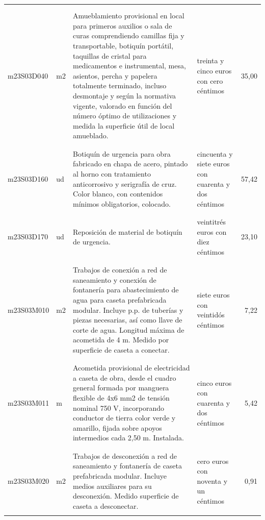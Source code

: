 \documentclass{book}%
\begin{document}
\begin{supertabular}{|l|l|p{5cm}|p{3cm}|r|}
&&&&\\%
&&&&\\%
m23S03D040&m2&Amueblamiento provisional en local para primeros auxilios o sala de curas comprendiendo camillas fija y transportable, botiquín portátil, taquillas de cristal para medicamentos e instrumental, mesa, asientos, percha y papelera totalmente terminado, incluso desmontaje y según la normativa vigente, valorado en función del número óptimo de utilizaciones y medida la superficie útil de local amueblado.&treinta y cinco euros con cero céntimos&35,00\\%
&&&&\\%
&&&&\\%
m23S03D160&ud&Botiquín de urgencia para obra fabricado en chapa de acero, pintado al horno con tratamiento anticorrosivo y serigrafía de cruz. Color blanco, con contenidos mínimos obligatorios, colocado.&cincuenta y siete euros con cuarenta y dos céntimos&57,42\\%
&&&&\\%
&&&&\\%
m23S03D170&ud&Reposición de material de botiquín de urgencia.&veintitrés euros con diez céntimos&23,10\\%
&&&&\\%
&&&&\\%
m23S03M010&m2&Trabajos de conexión a red de saneamiento y conexión de fontanería para abastecimiento de agua para caseta prefabricada modular. Incluye p.p. de tuberías y piezas necesarias, así como llave de corte de agua. Longitud máxima de acometida de 4 m. Medido por superficie de caseta a conectar.&siete euros con veintidós céntimos&7,22\\%
&&&&\\%
&&&&\\%
m23S03M011&m&Acometida provisional de electricidad a caseta de obra, desde el cuadro general formada por manguera flexible de 4x6 mm2 de tensión nominal 750 V, incorporando conductor de tierra color verde y amarillo, fijada sobre apoyos intermedios cada 2,50 m. Instalada.&cinco euros con cuarenta y dos céntimos&5,42\\%
&&&&\\%
&&&&\\%
m23S03M020&m2&Trabajos de desconexión a red de saneamiento y fontanería de caseta prefabricada modular. Incluye medios auxiliares para su desconexión. Medido superficie de caseta a desconectar.&cero euros con noventa y un céntimos&0,91\\%
&&&&\\%

\end{supertabular}
\end{document}
